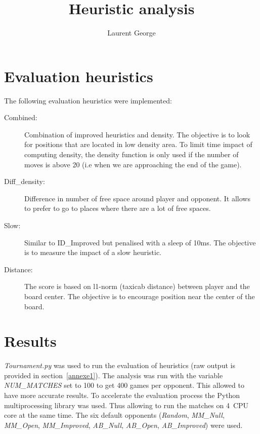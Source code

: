 \documentclass{article}
\author{Laurent George}
\title{Heuristic analysis}
\begin{document}
\maketitle

\section{Evaluation heuristics}

The following evaluation heuristics were implemented:

\begin{description}
    \item[Combined:] Combination of improved heuristics and density. The objective is to look for positions that are located in low density area. To limit time impact of computing density, the density function is only used if the number of moves is above 20 (i.e when we are approaching the end of the game).
\item[Diff\_density:] Difference in number of free space around player and opponent. It allows to prefer to go to places where there are a lot of free spaces.
\item[Slow:] Similar to ID\_Improved but penalised with a sleep of 10ms. The objective is to measure the impact of a slow heuristic.
\item[Distance:] The score is based on l1-norm (taxicab distance) between player and the board center. The objective is to encourage position near the center of the board.
\end{description}

\section{Results}

\emph{Tournament.py} was used to run the evaluation of heuristics (raw output is provided in section~\ref{annexe1}). 
The analysis was run with the variable \emph{NUM\_MATCHES} set to 100 to get 400 games per opponent. This allowed to have more accurate results. To accelerate the evaluation process the Python multiprocessing library was used. Thus allowing to run the matches on 4~CPU core at the same time. The six default opponents (\emph{Random},  \emph{MM\_Null},  \emph{MM\_Open},  \emph{MM\_Improved}, \emph{AB\_Null}, \emph{AB\_Open}, \emph{AB\_Improved}) were used.
\end{document}
